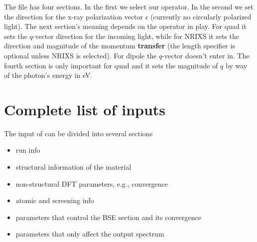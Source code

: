 \documentclass[11pt]{report}
\begin{document}
The file has four sections. In the first we select our operator. 
In the second we set the direction for the x-ray polarization vector $\epsilon$ (currently no circularly polarized light). 
The next section's meaning depends on the operator in play. 
For quad it sets the $q$-vector direction for the incoming light, 
while for NRIXS it sets the direction and magnitude of the momentum \textbf{transfer} 
(the length specifier is optional unless NRIXS is selected). For dipole the $q$-vector doesn't enter in. 
The fourth section is only important for quad and it sets the magnitude of $q$ by way of the photon's energy in eV. 

\section{Complete list of  inputs}

The input of  can be divided into several sections

\begin{itemize}
\item run info
\item structural information of the material
\item non-structural DFT parameters, e.g., convergence
\item atomic and screening info
\item parameters that control the BSE section and its convergence
\item parameters that only affect the output spectrum
\end{itemize}
\end{document}

